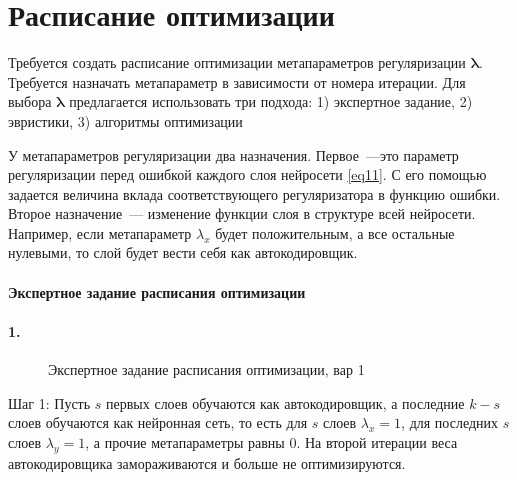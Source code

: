\documentclass[12pt, twoside]{article}
\begin{document}
\section{Расписание оптимизации}
Требуется создать расписание оптимизации метапараметров регуляризации $\boldsymbol{\lambda}$. Требуется назначать метапараметр в зависимости от номера итерации.  Для выбора $\boldsymbol{\lambda}$ предлагается использовать три подхода: 1) экспертное задание, 2) эвристики, 3) алгоритмы оптимизации 

У метапараметров регуляризации два назначения. Первое~---это параметр регуляризации перед ошибкой каждого слоя нейросети \eqref{eq11}. С его помощью задается величина вклада соответствующего регуляризатора в функцию ошибки. Второе назначение~--- изменение функции слоя в структуре всей нейросети. Например, если метапараметр $\lambda_x$ будет положительным, а все остальные нулевыми, то слой будет вести себя как автокодировщик.


\paragraph{Экспертное задание расписания оптимизации}

\paragraph{1.}
\begin{figure}[h!]
\caption{Экспертное задание расписания оптимизации, вар 1}
\label{fig:opt schedule 1}
\end{figure}
Шаг 1: Пусть $s$ первых слоев обучаются как автокодировщик, а последние $k - s$ слоев обучаются как нейронная сеть, то есть для $s$ слоев $\lambda_x = 1$, для последних $s$ слоев $\lambda_y = 1$, а прочие метапараметры равны 0. На второй итерации веса автокодировщика замораживаются и больше не оптимизируются.
\end{document}

